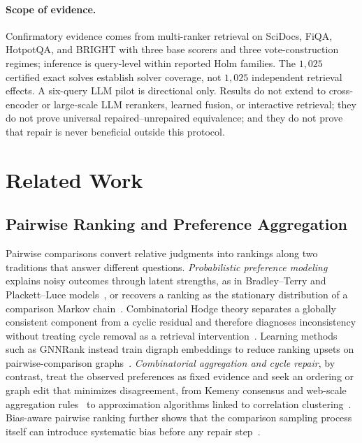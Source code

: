 \documentclass[pdflatex,sn-basic,Numbered]{sn-jnl}
\begin{document}
\paragraph{Scope of evidence.}
Confirmatory evidence comes from multi-ranker retrieval on SciDocs, FiQA,
HotpotQA, and BRIGHT with three base scorers and three vote-construction
regimes; inference is query-level within reported Holm families. The
$1{,}025$ certified exact solves establish solver coverage, not $1{,}025$
independent retrieval effects. A six-query LLM pilot is directional only.
Results do not extend to cross-encoder or large-scale LLM rerankers, learned
fusion, or interactive retrieval; they do not prove universal
repaired--unrepaired equivalence; and they do not prove that repair is never
beneficial outside this protocol.

\section{Related Work}
\label{sec:related_work}

\subsection{Pairwise Ranking and Preference Aggregation}
\label{sec:related-pairwise}

Pairwise comparisons convert relative judgments into rankings along two
traditions that answer different questions. \emph{Probabilistic preference
modeling} explains noisy outcomes through latent strengths, as in
Bradley--Terry and Plackett--Luce
models~\cite{bradley1952rank,hunter2004mm,plackett1975analysis,luce1959individual},
or recovers a ranking as the stationary distribution of a comparison
Markov chain~\cite{negahban2017rankcentrality}. Combinatorial Hodge theory
separates a globally consistent component from a cyclic residual and
therefore diagnoses inconsistency without treating cycle removal as a
retrieval intervention~\cite{jiang2011hodge,vigna2016spectral}. Learning
methods such as GNNRank instead train digraph embeddings to reduce ranking
upsets on pairwise-comparison graphs~\cite{he2022gnnrank}.
\emph{Combinatorial aggregation and cycle repair}, by contrast, treat the
observed preferences as fixed evidence and seek an ordering or graph edit
that minimizes disagreement, from Kemeny consensus and web-scale
aggregation rules~\cite{kemeny1959mathematics,dwork2001rank} to
approximation algorithms linked to correlation
clustering~\cite{ailon2008aggregating,kenyon2007fewerrors}. Bias-aware
pairwise ranking further shows that the comparison sampling process itself
can introduce systematic bias before any repair step~\cite{ferrara2024biasaware}.
\end{document}
